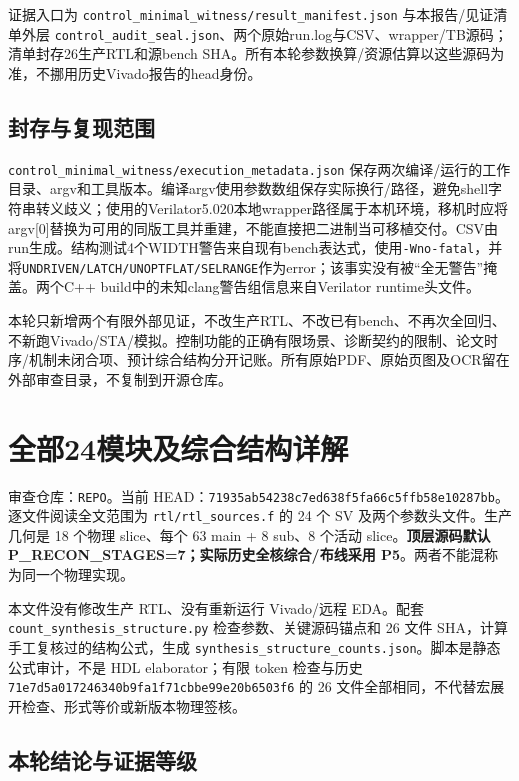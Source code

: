 \documentclass[UTF8,fontset=fandol,10pt,a4paper,openany]{ctexrep}
\newcommand{\code}[1]{\nolinkurl{#1}}
\begin{document}
证据入口为 \code{control_minimal_witness/result_manifest.json} 与本报告/见证清单外层 \code{control_audit_seal.json}、两个原始run.log与CSV、wrapper/TB源码；清单封存26生产RTL和源bench SHA。所有本轮参数换算/资源估算以这些源码为准，不挪用历史Vivado报告的head身份。




\section{封存与复现范围}


\code{control_minimal_witness/execution_metadata.json} 保存两次编译/运行的工作目录、argv和工具版本。编译argv使用参数数组保存实际换行/路径，避免shell字符串转义歧义；使用的Verilator5.020本地wrapper路径属于本机环境，移机时应将argv[0]替换为可用的同版工具并重建，不能直接把二进制当可移植交付。CSV由run生成。结构测试4个WIDTH警告来自现有bench表达式，使用\code{-Wno-fatal}，并将\code{UNDRIVEN/LATCH/UNOPTFLAT/SELRANGE}作为error；该事实没有被“全无警告”掩盖。两个C++ build中的未知clang警告组信息来自Verilator runtime头文件。


本轮只新增两个有限外部见证，不改生产RTL、不改已有bench、不再次全回归、不新跑Vivado/STA/模拟。控制功能的正确有限场景、诊断契约的限制、论文时序/机制未闭合项、预计综合结构分开记账。所有原始PDF、原始页图及OCR留在外部审查目录，不复制到开源仓库。
\chapter{全部24模块及综合结构详解}


审查仓库：\code{REPO}。当前 HEAD：\code{71935ab54238c7ed638f5fa66c5ffb58e10287bb}。逐文件阅读全文范围为 \code{rtl/rtl_sources.f} 的 24 个 SV 及两个参数头文件。生产几何是 18 个物理 slice、每个 63 main + 8 sub、8 个活动 slice。\textbf{顶层源码默认 P\_RECON\_STAGES=7；实际历史全核综合/布线采用 P5}。两者不能混称为同一个物理实现。


本文件没有修改生产 RTL、没有重新运行 Vivado/远程 EDA。配套 \code{count_synthesis_structure.py} 检查参数、关键源码锚点和 26 文件 SHA，计算手工复核过的结构公式，生成 \code{synthesis_structure_counts.json}。脚本是静态公式审计，不是 HDL elaborator；有限 token 检查与历史 \code{71e7d5a017246340b9fa1f71cbbe99e20b6503f6} 的 26 文件全部相同，不代替宏展开检查、形式等价或新版本物理签核。


\section{本轮结论与证据等级}
\end{document}
